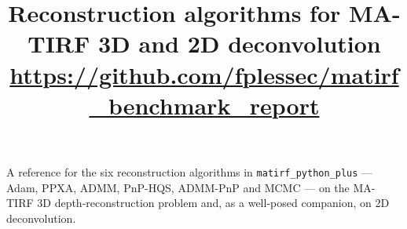 \documentclass[11pt]{article}
\title{Reconstruction algorithms for MA-TIRF 3D and 2D deconvolution\\[4pt]
       \large\url{https://github.com/fplessec/matirf_benchmark_report}}
\author{}
\date{}
\begin{document}
\maketitle

\noindent A reference for the six reconstruction algorithms in \texttt{matirf\_python\_plus} ---
Adam, PPXA, ADMM, PnP-HQS, ADMM-PnP and MCMC --- on the MA-TIRF 3D depth-reconstruction problem
and, as a well-posed companion, on 2D deconvolution.

\tableofcontents
\bigskip











\end{document}
